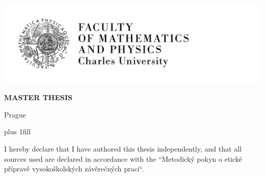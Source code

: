 

\pagestyle{empty}
\hypersetup{pageanchor=false}
\begin{center}

\centerline{\mbox{\includegraphics[width=166mm]{img/logo-en.pdf}}}

\vspace{-8mm}
\vfill

{\bf\Large MASTER THESIS}

\vfill

{\LARGE\ThesisAuthor}

\vspace{15mm}

{\LARGE\bfseries\ThesisTitle}

\vfill

\Department

\vfill

{
\centerline{\vbox{}}}

\vfill

Prague \YearSubmitted

\end{center}

\newpage



\openright
\hypersetup{pageanchor=true}
\pagestyle{plain}
\vglue 0pt plus 1fill

\noindent
I hereby declare that I have authored this thesis independently, and that all
sources used are declared in accordance with the “Metodický pokyn o etické
přípravě vysokoškolských závěrečných prací“.

